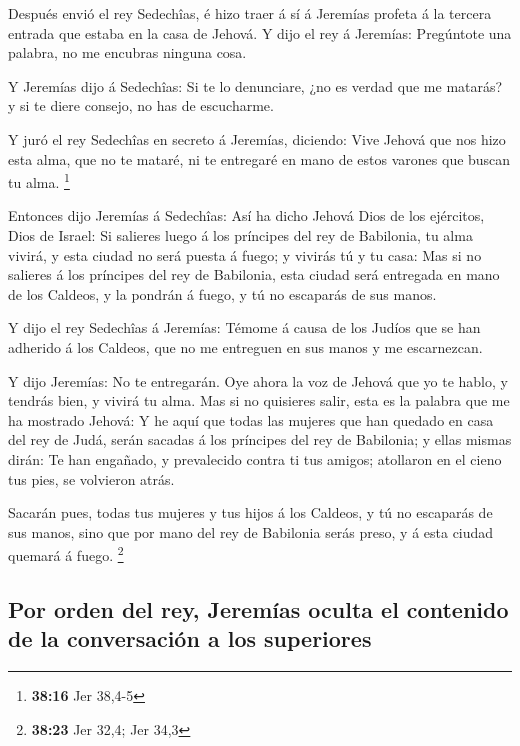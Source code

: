  Después envió el rey Sedechîas, é hizo traer á sí á
Jeremías profeta á la tercera entrada que estaba en la casa de Jehová. Y
dijo el rey á Jeremías: Pregúntote una palabra, no me encubras ninguna
cosa.

 Y Jeremías dijo á Sedechîas: Si te lo denunciare, ¿no es
verdad que me matarás? y si te diere consejo, no has de escucharme.

 Y juró el rey Sedechîas en secreto á Jeremías, diciendo:
Vive Jehová que nos hizo esta alma, que no te mataré, ni te entregaré en
mano de estos varones que buscan tu alma. \footnote{\textbf{38:16} Jer
  38,4-5}

 Entonces dijo Jeremías á Sedechîas: Así ha dicho Jehová
Dios de los ejércitos, Dios de Israel: Si salieres luego á los príncipes
del rey de Babilonia, tu alma vivirá, y esta ciudad no será puesta á
fuego; y vivirás tú y tu casa:  Mas si no salieres á los
príncipes del rey de Babilonia, esta ciudad será entregada en mano de
los Caldeos, y la pondrán á fuego, y tú no escaparás de sus manos.

 Y dijo el rey Sedechîas á Jeremías: Témome á causa de
los Judíos que se han adherido á los Caldeos, que no me entreguen en sus
manos y me escarnezcan.

 Y dijo Jeremías: No te entregarán. Oye ahora la voz de
Jehová que yo te hablo, y tendrás bien, y vivirá tu alma.
 Mas si no quisieres salir, esta es la palabra que me ha
mostrado Jehová:  Y he aquí que todas las mujeres que han
quedado en casa del rey de Judá, serán sacadas á los príncipes del rey
de Babilonia; y ellas mismas dirán: Te han engañado, y prevalecido
contra ti tus amigos; atollaron en el cieno tus pies, se volvieron
atrás.

 Sacarán pues, todas tus mujeres y tus hijos á los
Caldeos, y tú no escaparás de sus manos, sino que por mano del rey de
Babilonia serás preso, y á esta ciudad quemará á fuego. \footnote{\textbf{38:23}
  Jer 32,4; Jer 34,3}

\hypertarget{por-orden-del-rey-jeremuxedas-oculta-el-contenido-de-la-conversaciuxf3n-a-los-superiores}{%
\subsection{Por orden del rey, Jeremías oculta el contenido de la
conversación a los
superiores}\label{por-orden-del-rey-jeremuxedas-oculta-el-contenido-de-la-conversaciuxf3n-a-los-superiores}}

